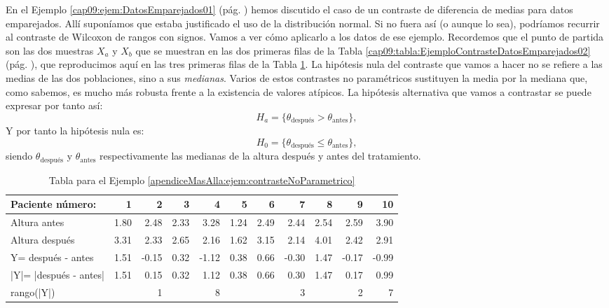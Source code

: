\begin{ejemplo}
\label{apendiceMasAlla:ejem:contrasteNoParametrico}
En el Ejemplo \ref{cap09:ejem:DatosEmparejados01} (pág. \pageref{cap09:ejem:DatosEmparejados01}) hemos discutido el caso de un contraste de diferencia de medias para datos emparejados. Allí suponíamos que estaba justificado el uso de la distribución normal. Si no fuera así (o aunque lo sea), podríamos recurrir al {\sf contraste de Wilcoxon de rangos con signos}. Vamos a ver cómo aplicarlo a los datos de ese ejemplo. Recordemos que el punto de partida son las dos muestras $X_a$ y $X_b$ que se muestran en las dos primeras filas de la Tabla \ref{cap09:tabla:EjemploContrasteDatosEmparejados02} (pág. \pageref{cap09:tabla:EjemploContrasteDatosEmparejados02}), que reproducimos aquí en las tres primeras filas de la Tabla \ref{apendiceMasAlla:tabla:contrasteNoParametrico}. La hipótesis nula del contraste que vamos a hacer no se refiere a las medias de las dos poblaciones, sino a sus {\em medianas}. Varios de estos contrastes no paramétricos sustituyen la media por la mediana que, como sabemos, es mucho más robusta frente a la existencia de valores atípicos. La hipótesis alternativa que vamos a contrastar se puede expresar por tanto así:
\[H_a = \{\theta_{\mbox{despu\'es}} > \theta_{\mbox{antes}}\},\]
Y por tanto la hipótesis nula es:
\[H_0 = \{\theta_{\mbox{despu\'es}} \leq \theta_{\mbox{antes}}\},\]
siendo $\theta_{\mbox{despu\'es}}$ y $\theta_{\mbox{antes}}$ respectivamente las medianas de la altura después y antes del tratamiento.
\begin{table}[htb]
{\scriptsize
    \begin{center}
    \begin{tabular}{|l|r|r|r|r|r|r|r|r|r|r|}
    \hline
    Paciente número:&1&2& 3 & 4 & 5 & 6 & 7 & 8 & 9 & 10 \\
    \hline
    Altura antes& 1.80 & 2.48 & 2.33 & 3.28 & 1.24 & 2.49 & 2.44 & 2.54 & 2.59 & 3.90\\
    \hline
    Altura después & 3.31 & 2.33 & 2.65 & 2.16 & 1.62 & 3.15 & 2.14 & 4.01 & 2.42 & 2.91  \\
    \hline
    Y= después - antes & 1.51& -0.15& 0.32& -1.12& 0.38& 0.66& -0.30& 1.47& -0.17& -0.99  \\
    \hline
    |Y|= |después - antes| & 1.51& 0.15& 0.32& 1.12& 0.38& 0.66& 0.30& 1.47& 0.17& 0.99  \\
    \hline
    rango(|Y|) & \cellcolor[gray]{0.9}{10}& 1& \cellcolor[gray]{0.9}{4}& 8& \cellcolor[gray]{0.9}{5}& \cellcolor[gray]{0.9}{6}& 3& \cellcolor[gray]{0.9}{9}& 2& 7\\
    \hline
    \end{tabular}
    \end{center}
}
\caption{Tabla para el Ejemplo \ref{apendiceMasAlla:ejem:contrasteNoParametrico}}
\label{apendiceMasAlla:tabla:contrasteNoParametrico}
\end{table}


\end{ejemplo}
